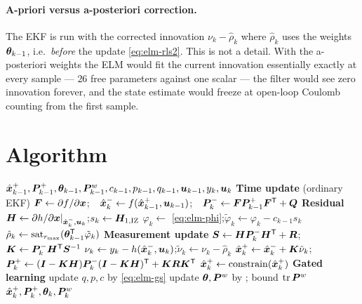 \paragraph{A-priori versus a-posteriori correction.}  The EKF is run with the corrected innovation
$\nu_k - \hat\rho_k$ where $\hat\rho_k$ uses the weights $\bm{\theta}_{k-1}$, i.e.\ \emph{before} the update
\cref{eq:elm-rls2}.  This is not a detail.  With the a-posteriori weights the ELM would fit the
current innovation essentially exactly at every sample --- $26$ free parameters against one scalar
--- the filter would see zero innovation forever, and the state estimate would freeze at open-loop
Coulomb counting from the first sample.

\section{Algorithm}
\begin{algorithm}[H]
\caption{ELM-RLS-EKF --- one sampling period}
\begin{algorithmic}[1]
\Require $\hat{\bm{x}}^{+}_{k-1}, \bm{P}^{+}_{k-1}, \bm{\theta}_{k-1}, \bm{P}^w_{k-1}, c_{k-1}, p_{k-1}, q_{k-1}, \bm{u}_{k-1}, y_k, \bm{u}_k$
\Statex \textbf{Time update} (ordinary EKF)
\State $\bm{F}\gets\partial f/\partial\bm{x}$;\ \ $\hat{\bm{x}}^{-}_k\gets f(\hat{\bm{x}}^{+}_{k-1},\bm{u}_{k-1})$;\ \
       $\bm{P}^{-}_k\gets \bm{F}\bm{P}^{+}_{k-1}\bm{F}^{\mathsf{T}}+\bm{Q}$
\Statex \textbf{Residual}
\State $\bm{H}\gets\partial h/\partial\bm{x}|_{\hat{\bm{x}}^{-}_k,\bm{u}_k}$;\quad $s_k\gets \bm{H}_{1,\text{IZ}}$ 
\State $\varphi_k\gets$ \eqref{eq:elm-phi};\quad $\tilde\varphi_k\gets \varphi_k - c_{k-1}s_k$ \Comment{eq.\ \eqref{eq:elm-proj}}
\State $\hat\rho_k\gets \operatorname{sat}_{r_{\max}}(\bm{\theta}_{k-1}^{\mathsf{T}}\tilde\varphi_k)$ \Comment{a-priori weights}
\Statex \textbf{Measurement update}
\State $\bm{S}\gets \bm{H}\bm{P}^{-}_k\bm{H}^{\mathsf{T}}+\bm{R}$;\quad $\bm{K}\gets\bm{P}^{-}_k\bm{H}^{\mathsf{T}}\bm{S}^{-1}$
\State $\nu_k \gets y_k - h(\hat{\bm{x}}^{-}_k,\bm{u}_k)$;\quad $\tilde\nu_k \gets \nu_k - \hat\rho_k$
\State $\hat{\bm{x}}^{+}_k\gets\hat{\bm{x}}^{-}_k+\bm{K}\tilde\nu_k$;\quad
       $\bm{P}^{+}_k\gets(\bm{I}-\bm{K}\bm{H})\bm{P}^{-}_k(\bm{I}-\bm{K}\bm{H})^{\mathsf{T}}+\bm{K}\bm{R}\bm{K}^{\mathsf{T}}$
\State $\hat{\bm{x}}^{+}_k\gets\operatorname{constrain}(\hat{\bm{x}}^{+}_k)$
\Statex \textbf{Gated learning}
  \State update $q,p,c$ by \eqref{eq:elm-gs}
  \State update $\bm{\theta},\bm{P}^w$ by ; bound $\operatorname{tr}\bm{P}^w$
\EndIf
\Ensure $\hat{\bm{x}}^{+}_k,\bm{P}^{+}_k,\bm{\theta}_k,\bm{P}^w_k$
\end{algorithmic}
\end{algorithm}

